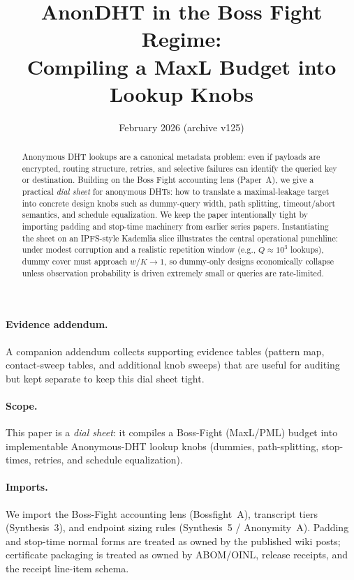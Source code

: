 \documentclass[11pt]{article}
\title{AnonDHT in the Boss Fight Regime:\\ Compiling a MaxL Budget into Lookup Knobs}
\author{}
\date{February 2026 (archive v125)}
\begin{document}
\maketitle

\begin{abstract}
Anonymous DHT lookups are a canonical metadata problem: even if payloads are encrypted, routing structure, retries, and selective failures can identify the queried key or destination.
Building on the Boss Fight accounting lens (Paper~A), we give a practical \emph{dial sheet} for anonymous DHTs:
how to translate a maximal-leakage target into concrete design knobs such as dummy-query width, path splitting, timeout/abort semantics, and schedule equalization.
We keep the paper intentionally tight by importing padding and stop-time machinery from earlier series papers.
Instantiating the sheet on an IPFS-style Kademlia slice illustrates the central operational punchline: under modest corruption and a realistic repetition window (e.g., $Q\approx10^3$ lookups), dummy cover must approach $w/K\to 1$, so dummy-only designs economically collapse unless observation probability is driven extremely small or queries are rate-limited.
\end{abstract}

\paragraph{Evidence addendum.} A companion addendum collects supporting evidence tables (pattern map, contact-sweep tables, and additional knob sweeps) that are useful for auditing but kept separate to keep this dial sheet tight.\cite{series:bossfightBaddendum}


\paragraph{Scope.}
This paper is a \emph{dial sheet}: it compiles a Boss-Fight (MaxL/PML) budget into implementable Anonymous-DHT lookup knobs (dummies, path-splitting, stop-times, retries, and schedule equalization).

\paragraph{Imports.}
We import the Boss-Fight accounting lens (Bossfight~A), transcript tiers (Synthesis~3), and endpoint sizing rules (Synthesis~5 / Anonymity~A).
Padding and stop-time normal forms are treated as owned by the published wiki posts; certificate packaging is treated as owned by ABOM/OINL, release receipts, and the receipt line-item schema.\cite{series:artifactpolicy,series:abomoinl,series:releaseproperty,series:receiptitems}
\end{document}
